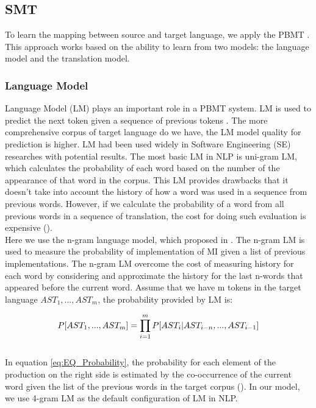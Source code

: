 
\subsection{SMT}
To learn the mapping between source and target language, we apply the PBMT \cite{Green2014}. This approach works based on the ability to learn from two models: the language model and the translation model.
\subsubsection{Language Model}
Language Model (LM) plays an important role in a PBMT system. LM is used to predict the next token given a sequence of previous tokens \cite{Koehn:2003:SPT:1073445.1073462}. The more comprehensive corpus of target language do we have, the LM model quality for prediction is higher. LM had been used widely in Software Engineering (SE) researches \cite{Hindle:2012:NS:2337223.2337322,Hel:7180076,Liu:7883371} with potential results. The most basic LM in NLP is uni-gram LM, which calculates the probability of each word based on the number of the appearance of that word in the corpus. This LM provides drawbacks that it doesn't take into account the history of how a word was used in a sequence from previous words. However, if we calculate the probability of a word from all previous words in a sequence of translation, the cost for doing such evaluation is expensive (\cite{Jurafsky:2009:SLP:1214993}). 
\\
Here we use the n-gram language model, which proposed in \cite{Jurafsky:2009:SLP:1214993}. The n-gram LM is used to measure the probability of implementation of MI given a list of previous implementations. The n-gram LM overcome the cost of measuring history for each word by considering and approximate the history for the last n-words that appeared before the current word. Assume that we have m tokens in the target language \({AST_{1},...,AST_{m}}\), the probability provided by LM is:

\begin{equation} 
\small
\label{eq:EQ_Probability}
 P[AST_{1}, ...,AST_{m}]=\prod_{i=1}^{m}P[AST_{i} | AST_{i-n},...,AST_{i-1}]
\end{equation}
\\

In equation \ref{eq:EQ_Probability}, the probability for each element of the production on the right side is estimated by the co-occurrence of the current word given the list of the previous words in the target corpus (\cite{Jurafsky:2009:SLP:1214993}). In our model, we use 4-gram LM as the default configuration of LM in NLP.

